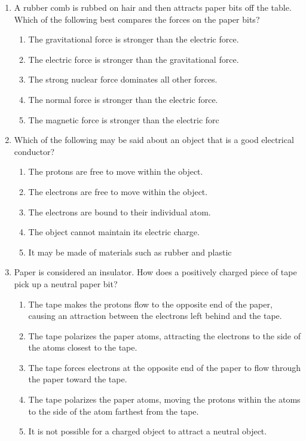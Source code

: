 \documentclass{../../../oss-apphys}
\begin{document}
\begin{multicols*}{2}
\begin{enumerate}[leftmargin=18pt]
  \item A rubber comb is rubbed on hair and then attracts paper bits off the
    table. Which of the following best compares the forces on the paper bits?
    \begin{enumerate}[nosep,leftmargin=18pt,label=(\Alph*)]
    \item The gravitational force is stronger than the electric force.
    \item The electric force is stronger than the gravitational force.
    \item The strong nuclear force dominates all other forces.
    \item The normal force is stronger than the electric force.
    \item The magnetic force is stronger than the electric forc
    \end{enumerate}
    \vspace{.7in}
    
  \item Which of the following may be said about an object that is a good
    electrical conductor?
    \begin{enumerate}[nosep,leftmargin=18pt,label=(\Alph*)]
    \item The protons are free to move within the object.
    \item The electrons are free to move within the object.
    \item The electrons are bound to their individual atom.
    \item The object cannot maintain its electric charge.
    \item It may be made of materials such as rubber and plastic
    \end{enumerate}
    \vspace{.7in}
    
  \item Paper is considered an insulator. How does a positively charged piece
    of tape pick up a neutral paper bit?
     \begin{enumerate}[nosep,leftmargin=18pt,label=(\Alph*)]
     \item The tape makes the protons flow to the opposite end of the paper,
       causing an attraction between the electrons left behind and the tape.
     \item The tape polarizes the paper atoms, attracting the electrons to the
       side of the atoms closest to the tape.
     \item The tape forces electrons at the opposite end of the paper to flow
       through the paper toward the tape.
     \item The tape polarizes the paper atoms, moving the protons within the
       atoms to the side of the atom farthest from the tape.
     \item It is not possible for a charged object to attract a neutral object.
     \end{enumerate}
     \vspace{.7in}
     \columnbreak
     

\end{enumerate}
\end{multicols*}
\end{document}
